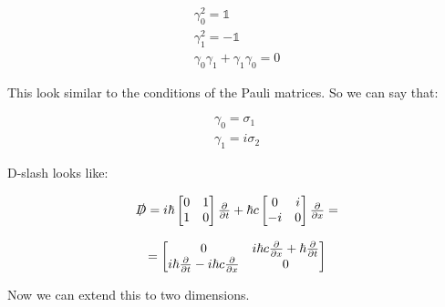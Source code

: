 \begin{equation}
  \begin{array}{c}
    \\
    \gamma_0^2 = \mathbb{1}
    \\
    \gamma_1^2 = -\mathbb{1}
    \\
    \gamma_0\gamma_1 + \gamma_1\gamma_0 = 0
  \end{array}
\end{equation}

This look similar to the conditions of the Pauli matrices. So we can say that:

\begin{equation}
  \begin{array}{c}
    \gamma_0 = \sigma_1
    \\
    \gamma_1 = i\sigma_2
  \end{array}
\end{equation}

D-slash looks like:

\begin{equation}
  \begin{array}{c}
    \slashed{D} = i\hbar\begin{bmatrix}
      0 & 1\\
      1 & 0\end{bmatrix} \frac{\partial}{\partial t} + \hbar c \begin{bmatrix}
      0 & i\\
      -i & 0\end{bmatrix} \frac{\partial}{\partial x} =
      \\

      \\
      = \begin{bmatrix}
      0 & i\hbar c \frac{\partial}{\partial x} + \hbar \frac{\partial}{\partial t}\\
      i\hbar \frac{\partial}{\partial t} - i\hbar c \frac{\partial}{\partial x} & 0\end{bmatrix}
  \end{array}
\end{equation}

Now we can extend this to two dimensions.

